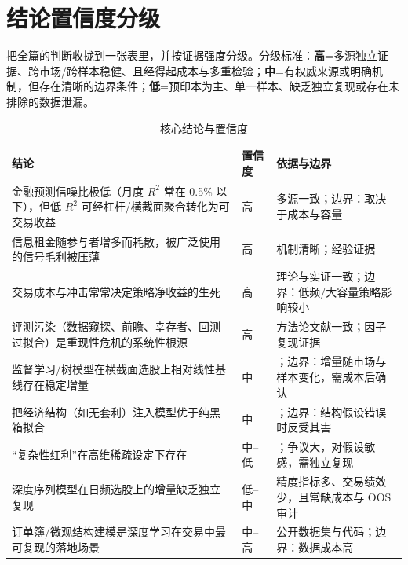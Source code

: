 \section{结论置信度分级}\label{sec:confidence}

把全篇的判断收拢到一张表里，并按证据强度分级。分级标准：\textbf{高}=多源独立证据、跨市场/跨样本稳健、且经得起成本与多重检验；\textbf{中}=有权威来源或明确机制，但存在清晰的边界条件；\textbf{低}=预印本为主、单一样本、缺乏独立复现或存在未排除的数据泄漏。

\begin{table}[htbp]
\centering
\caption{核心结论与置信度}
\label{tab:confidence}
\begin{tabular}{@{}>{\raggedright\arraybackslash}p{6.6cm}>{\raggedright\arraybackslash}p{1.6cm}>{\raggedright\arraybackslash}p{6.6cm}@{}}
\toprule
结论 & 置信度 & 依据与边界 \\
\midrule
金融预测信噪比极低（月度 $R^2$ 常在 0.5\% 以下），但低 $R^2$ 可经杠杆/横截面聚合转化为可交易收益 & 高 & 多源一致\cite{gukellyxiu2020}；边界：取决于成本与容量 \\
\midrule
信息租金随参与者增多而耗散，被广泛使用的信号毛利被压薄 & 高 & 机制清晰\cite{grossmanstiglitz1980,kyle1985}；经验证据\cite{mcleanpontiff2016} \\
\midrule
交易成本与冲击常常决定策略净收益的生死 & 高 & 理论与实证一致\cite{almgrenchriss2000,martin2011}；边界：低频/大容量策略影响较小 \\
\midrule
评测污染（数据窥探、前瞻、幸存者、回测过拟合）是重现性危机的系统性根源 & 高 & 方法论文献一致\cite{white2000,harveylz2016,bailey2016pbo}；因子复现证据\cite{jensen2023} \\
\midrule
监督学习/树模型在横截面选股上相对线性基线存在稳定增量 & 中 & \cite{gukellyxiu2020,krauss2017}；边界：增量随市场与样本变化，需成本后确认 \\
\midrule
把经济结构（如无套利）注入模型优于纯黑箱拟合 & 中 & \cite{chenpelgerzhu2024,gukellyxiu2021}；边界：结构假设错误时反受其害 \\
\midrule
“复杂性红利”在高维稀疏设定下存在 & 中--低 & \cite{kellymalamudzhou2024}；争议大，对假设敏感，需独立复现 \\
\midrule
深度序列模型在日频选股上的增量缺乏独立复现 & 低--中 & 精度指标多、交易绩效少，且常缺成本与 OOS 审计 \\
\midrule
订单簿/微观结构建模是深度学习在交易中最可复现的落地场景 & 中--高 & 公开数据集与代码\cite{ntakaris2018fi2010,zhang2019deeplob}；边界：数据成本高 \\

\end{tabular}
\end{table}
